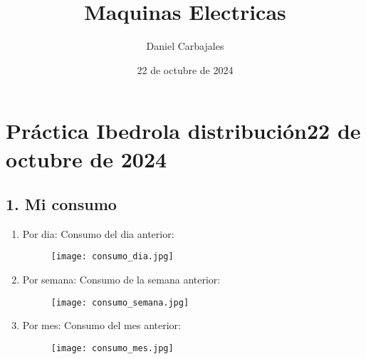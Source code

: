 \documentclass{report}
\title{\Huge{Maquinas Electricas}}
\author{\large{Daniel Carbajales}}
\date{22 de octubre de 2024}
\begin{document}
  \section*{Práctica Ibedrola distribución\hfill22 de octubre de 2024}
    \subsection*{1. Mi consumo}
      \begin{enumerate}[label=\alph*)]
        \item{Por dia: }Consumo del dia anterior: 
          \begin{figure}[h]
            \centering
            \texttt{[image: consumo\_dia.jpg]}
          \end{figure}
        \item{Por semana: }Consumo de la semana anterior:
          \begin{figure}[h]
            \centering
            \texttt{[image: consumo\_semana.jpg]}
          \end{figure}
          \newpage
        \item{Por mes: }Consumo del mes anterior:
          \begin{figure}[h]
            \centering
            \texttt{[image: consumo\_mes.jpg]}
          \end{figure}

      \end{enumerate}
\end{document}
